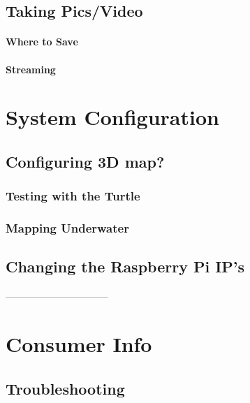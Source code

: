 \documentclass[
18pt, %
a4paper, %
oneside, %
headinclude,footinclude, %
]{scrartcl}
\begin{document}


\subsection{Taking Pics/Video}



\paragraph{Where to Save} 

\paragraph{Streaming} 



\section{System Configuration}




\subsection{Configuring 3D map?}


\subsubsection{Testing with the Turtle}


\subsubsection{Mapping Underwater}



\subsection{Changing the Raspberry Pi IP's}

--------------------------------

\section{Consumer Info}

\subsection{Troubleshooting}
\end{document}
